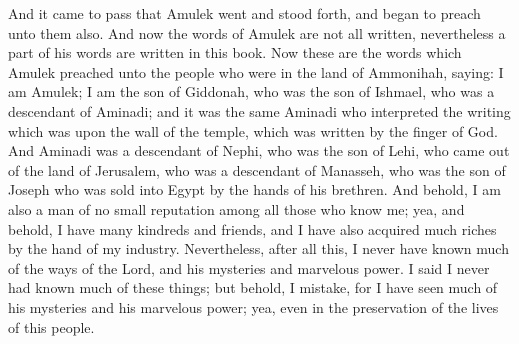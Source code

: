 \bverse \iffalse And it came to pass that Amulek went and stood forth, and began to preach unto them also. And now the words of Amulek are not all written, nevertheless a part of his words are written in this book. \fi
And it came to pass that Amulek went and stood forth, and began to preach unto them also. And now the words of Amulek are not all written, nevertheless a part of his words are written in this book.
\bchapter
\bverse \iffalse Now these are the words which Amulek preached unto the people who were in the land of Ammonihah, saying: \fi
Now these are the words which Amulek preached unto the people who were in the land of Ammonihah, saying:
\bverse \iffalse I am Amulek; I am the son of Giddonah, who was the son of Ishmael, who was a descendant of Aminadi; and it was the same Aminadi who interpreted the writing which was upon the wall of the temple, which was written by the finger of God. \fi
I am Amulek; I am the son of Giddonah, who was the son of Ishmael, who was a descendant of Aminadi; and it was the same Aminadi who interpreted the writing which was upon the wall of the temple, which was written by the finger of God.
\bverse \iffalse And Aminadi was a descendant of Nephi, who was the son of Lehi, who came out of the land of Jerusalem, who was a descendant of Manasseh, who was the son of Joseph who was sold into Egypt by the hands of his brethren. \fi
And Aminadi was a descendant of Nephi, who was the son of Lehi, who came out of the land of Jerusalem, who was a descendant of Manasseh, who was the son of Joseph who was sold into Egypt by the hands of his brethren.
\bverse \iffalse And behold, I am also a man of no small reputation among all those who know me; yea, and behold, I have many kindreds and friends, and I have also acquired much riches by the hand of my industry. \fi
And behold, I am also a man of no small reputation among all those who know me; yea, and behold, I have many kindreds and friends, and I have also acquired much riches by the hand of my industry.
\bverse \iffalse Nevertheless, after all this, I never have known much of the ways of the Lord, and his mysteries and marvelous power. I said I never had known much of these things; but behold, I mistake, for I have seen much of his mysteries and his marvelous power; yea, even in the preservation of the lives of this people. \fi
Nevertheless, after all this, I never have known much of the ways of the Lord, and his mysteries and marvelous power. I said I never had known much of these things; but behold, I mistake, for I have seen much of his mysteries and his marvelous power; yea, even in the preservation of the lives of this people.
